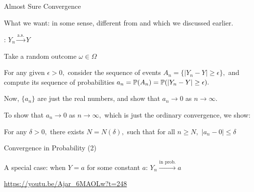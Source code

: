 \begin{frame}{Almost Sure Convergence}

\plitemsep 0.07in

\bci

\item<1-> What we want:  in some sense, different from  and  which we discussed earlier.

\item<2-> : $Y_n \xrightarrow{\text{a.s.}} Y$

\item<3-> Take a random outcome $\omega \in \Omega$

For any given $\epsilon >0,$ consider the sequence of events $A_n = \{|Y_n -Y| \geq \epsilon \},$ and compute its sequence of probabilities $a_n = \mathbb{P}( A_n ) = \mathbb{P}( |Y_n -Y| \geq \epsilon ).$

\item<3-> Now, $\{a_n\}$ are just the real numbers, and show that $a_n \rightarrow 0$ as $n \rightarrow \infty.$

\item<4-> To show that $a_n \rightarrow 0$ as $n \rightarrow \infty,$ which is just the ordinary convergence, we show:
\bci
\item<5-> For any $\delta >0,$ there exists $N = N(\delta),$ such that for all $n \geq N,$ $|a_n - 0 | \leq \delta$

\eci


\eci
\end{frame}

\begin{frame}{Convergence in Probability (2)}


\plitemsep 0.1in

\bci

\item A special case: when $Y=a$ for some constant $a$: $Y_n \xrightarrow{\text{in prob.}} a$

\item \url{https://youtu.be/Ajar_6MAOLw?t=248}

\eci
\end{frame}


